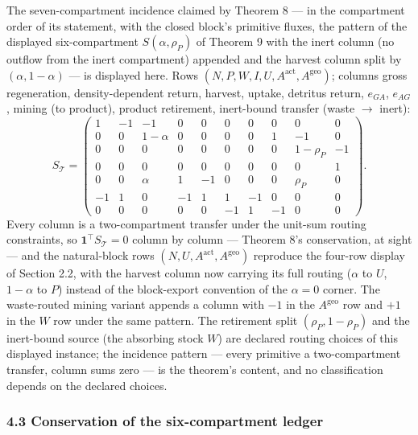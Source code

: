 \documentclass[11pt]{article}
\begin{document}
The seven-compartment incidence claimed by Theorem 8 --- in the
compartment order of its statement, with the closed block's primitive
fluxes, the pattern of the displayed six-compartment
\(S(\alpha, \rho_P)\) of Theorem 9 with the inert column (no outflow
from the inert compartment) appended and the harvest column split by
\((\alpha, 1-\alpha)\) --- is displayed here. Rows
\((N, P, W, I, U, A^{\mathrm{act}}, A^{\mathrm{geo}})\); columns gross
regeneration, density-dependent return, harvest, uptake, detritus
return, \(e_{GA}\), \(e_{AG}\), mining (to product), product retirement,
inert-bound transfer (waste \(\to\) inert): \[S_{\mathcal{T}} =
\begin{pmatrix}
1 & -1 & -1 & 0 & 0 & 0 & 0 & 0 & 0 & 0 \\
0 & 0 & 1-\alpha & 0 & 0 & 0 & 0 & 1 & -1 & 0 \\
0 & 0 & 0 & 0 & 0 & 0 & 0 & 0 & 1-\rho_P & -1 \\
0 & 0 & 0 & 0 & 0 & 0 & 0 & 0 & 0 & 1 \\
0 & 0 & \alpha & 1 & -1 & 0 & 0 & 0 & \rho_P & 0 \\
-1 & 1 & 0 & -1 & 1 & 1 & -1 & 0 & 0 & 0 \\
0 & 0 & 0 & 0 & 0 & -1 & 1 & -1 & 0 & 0
\end{pmatrix}.\] Every column is a two-compartment transfer under the
unit-sum routing constraints, so \(\mathbf{1}^\top S_{\mathcal{T}} = 0\)
column by column --- Theorem 8's conservation, at sight --- and the
natural-block rows \((N, U, A^{\mathrm{act}}, A^{\mathrm{geo}})\)
reproduce the four-row display of Section 2.2, with the harvest column
now carrying its full routing (\(\alpha\) to \(U\), \(1-\alpha\) to
\(P\)) instead of the block-export convention of the \(\alpha = 0\)
corner. The waste-routed mining variant appends a column with \(-1\) in
the \(A^{\mathrm{geo}}\) row and \(+1\) in the \(W\) row under the same
pattern. The retirement split \((\rho_P, 1-\rho_P)\) and the inert-bound
source (the absorbing stock \(W\)) are declared routing choices of this
displayed instance; the incidence pattern --- every primitive a
two-compartment transfer, column sums zero --- is the theorem's content,
and no classification depends on the declared choices.

\subsubsection{4.3 Conservation of the six-compartment
ledger}\label{conservation-of-the-six-compartment-ledger}
\end{document}
